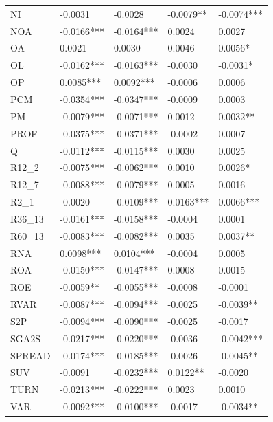 \begin{tabular}{lllll}
NI      &     -0.0031 &      -0.0028 &        -0.0079** &  -0.0074*** \\
NOA     &  -0.0166*** &   -0.0164*** &           0.0024 &      0.0027 \\
OA      &      0.0021 &       0.0030 &           0.0046 &     0.0056* \\
OL      &  -0.0162*** &   -0.0163*** &          -0.0030 &    -0.0031* \\
OP      &   0.0085*** &    0.0092*** &          -0.0006 &      0.0006 \\
PCM     &  -0.0354*** &   -0.0347*** &          -0.0009 &      0.0003 \\
PM      &  -0.0079*** &   -0.0071*** &           0.0012 &    0.0032** \\
PROF    &  -0.0375*** &   -0.0371*** &          -0.0002 &      0.0007 \\
Q       &  -0.0112*** &   -0.0115*** &           0.0030 &      0.0025 \\
R12\_2   &  -0.0075*** &   -0.0062*** &           0.0010 &     0.0026* \\
R12\_7   &  -0.0088*** &   -0.0079*** &           0.0005 &      0.0016 \\
R2\_1    &     -0.0020 &   -0.0109*** &        0.0163*** &   0.0066*** \\
R36\_13  &  -0.0161*** &   -0.0158*** &          -0.0004 &      0.0001 \\
R60\_13  &  -0.0083*** &   -0.0082*** &           0.0035 &    0.0037** \\
RNA     &   0.0098*** &    0.0104*** &          -0.0004 &      0.0005 \\
ROA     &  -0.0150*** &   -0.0147*** &           0.0008 &      0.0015 \\
ROE     &   -0.0059** &   -0.0055*** &          -0.0008 &     -0.0001 \\
RVAR    &  -0.0087*** &   -0.0094*** &          -0.0025 &   -0.0039** \\
S2P     &  -0.0094*** &   -0.0090*** &          -0.0025 &     -0.0017 \\
SGA2S   &  -0.0217*** &   -0.0220*** &          -0.0036 &  -0.0042*** \\
SPREAD  &  -0.0174*** &   -0.0185*** &          -0.0026 &   -0.0045** \\
SUV     &     -0.0091 &   -0.0232*** &         0.0122** &     -0.0020 \\
TURN    &  -0.0213*** &   -0.0222*** &           0.0023 &      0.0010 \\
VAR     &  -0.0092*** &   -0.0100*** &          -0.0017 &   -0.0034** \\
\bottomrule
\end{tabular}
